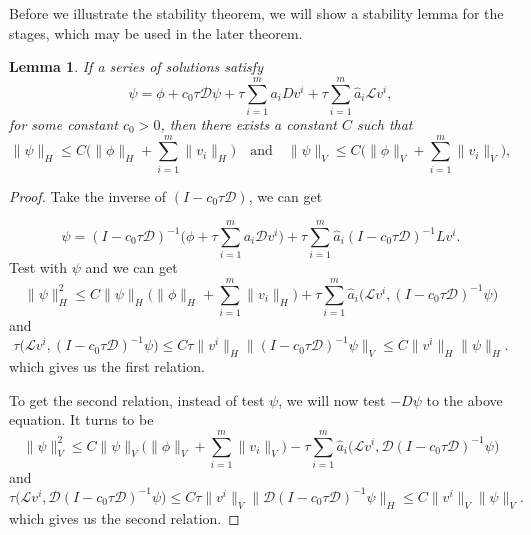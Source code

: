 \documentclass[a4paper, oneside]{book}
\def\hata{{\hat{a}}}
\def\calD{{\mathcal{D}}}
\def\calL{{\mathcal{L}}}
\newtheorem{lemma}{Lemma}[section]
\begin{document}
Before we illustrate the stability theorem, we will show a stability lemma for the stages, which may be used in the later theorem.
\begin{lemma}\label{thm:Stages}
    If a series of solutions satisfy
    $$\psi = \phi + c_0 \tau \calD\psi + \tau \sum\limits_{i=1}^{m}a_{i}Dv^i + \tau \sum\limits_{i=1}^{m}\hata_{i}\calL v^{i},$$
    for some constant $c_0>0$, then there exists a constant $C$ such that
    $$\|\psi\|_H \leq C\Big( \|\phi\|_H + \sum_{i=1}^m \|v_i\|_H \Big)
    \quad \text{and}\quad \|\psi\|_V \leq C\Big( \|\phi\|_V + \sum_{i=1}^m \|v_i\|_V \Big),$$
\end{lemma}
\begin{proof}Take the inverse of $(I - c_0 \tau\calD)$, we can get

$$\psi = (I - c_0 \tau\calD)^{-1}\Big(\phi + \tau \sum\limits_{i=1}^{m}a_{i}\calD v^i\Big) + \tau \sum\limits_{i=1}^{m}\hata_{i}(I - c_0 \tau \calD)^{-1}Lv^{i}.$$
Test with $\psi$ and we can get
$$\|\psi\|_H^2 \leq C\|\psi\|_H\Big(\|\phi\|_H + \sum_{i=1}^m \|v_i\|_H\Big) + \tau \sum\limits_{i=1}^{m} \hata_i\Big(\calL v^{i}, (I - c_0 \tau \calD)^{-1} \psi\Big)$$
and
$$\tau \Big(\calL v^{i}, (I - c_0 \tau \calD)^{-1} \psi\Big) \leq C \tau \|v^i\|_H \|(I - c_0 \tau \calD)^{-1} \psi\|_V \leq C \|v^i\|_H \|\psi\|_H.$$
which gives us the first relation.

To get the second relation, instead of test $\psi$, we will now test $-D\psi$ to the above equation. It turns to be
$$\|\psi\|_V^2 \leq C\|\psi\|_V\Big(\|\phi\|_V + \sum_{i=1}^m \|v_i\|_V\Big) - \tau \sum\limits_{i=1}^{m} \hata_i\Big(\calL v^{i}, \calD(I - c_0 \tau \calD)^{-1} \psi\Big)$$
and
$$\tau \Big(\calL v^{i}, \calD(I - c_0 \tau \calD)^{-1} \psi\Big) \leq  C\tau \|v^i\|_V \|\calD(I - c_0 \tau \calD)^{-1} \psi\|_H \leq C \|v^i\|_V \|\psi\|_V.$$
which gives us the second relation.
\end{proof}
\end{document}
